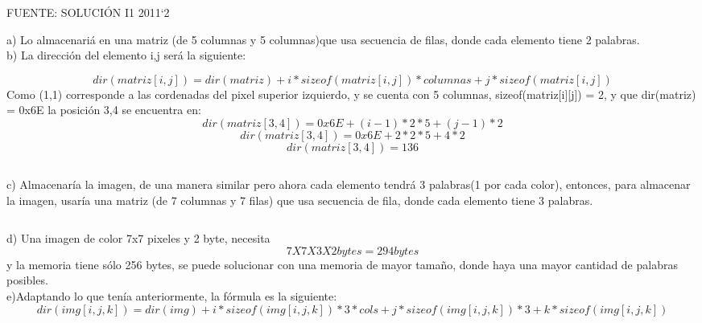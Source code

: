 \documentclass[letter]{article}
\begin{document}
	\begin{pregunta}{2}
	FUENTE: SOLUCIÓN I1 2011`2
$$ $$
	
a)  Lo almacenariá en una matriz (de 5 columnas y 5 columnas)que usa secuencia de filas,  donde cada elemento tiene 2 palabras.
$$ $$
b)	La dirección del elemento i,j será la siguiente:

$$dir(matriz[i,j]) = dir(matriz) + i*sizeof(matriz[i,j])*columnas + j * sizeof(matriz[i,j])$$
Como (1,1) corresponde a las cordenadas del pixel superior izquierdo, y se cuenta con 5 columnas,  sizeof(matriz[i][j]) = 2, y que dir(matriz) = 0x6E la posición 3,4 se encuentra en:
$$dir(matriz[3,4]) = 0x6E + (i-1)*2*5 + (j-1) * 2$$
$$dir(matriz[3,4]) = 0x6E + 2*2*5 + 4* 2$$
$$dir(matriz[3,4]) = 136$$

$$ $$

c) Almacenaría la imagen, de una manera similar pero ahora cada elemento tendrá 3 palabras(1 por cada color), entonces, para almacenar la imagen, usaría una matriz (de 7 columnas y 7 filas) que usa secuencia de fila, donde cada elemento tiene 3 palabras.

$$ $$

d) Una imagen de color 7x7 pixeles y 2 byte, necesita $$7X7X3X2 bytes = 294 bytes$$
y la memoria tiene sólo 256 bytes, se puede solucionar con una memoria de mayor tamaño, donde haya una mayor cantidad de palabras posibles.
$$ $$
e)Adaptando lo que tenía anteriormente, la fórmula es la siguiente:
$$ dir(img[i,j,k])=dir(img)+i*sizeof(img[i,j,k])*3*cols+
j*sizeof(img[i,j,k])*3+k*sizeof(img[i,j,k])$$

\end{pregunta}
	
\end{document}
